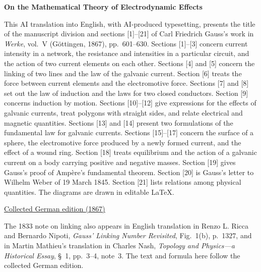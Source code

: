 \clearpage
{}
\thispagestyle{empty}
\begin{center}\Large\textbf{On the Mathematical Theory of Electrodynamic Effects}\end{center}

This AI translation into English, with AI-produced typesetting, presents the title of the manuscript division and sections [1]--[21] of Carl Friedrich Gauss’s work in \textit{Werke}, vol.~V (Göttingen, 1867), pp.~601--630. Sections [1]--[3] concern current intensity in a network, the resistance and intensities in a particular circuit, and the action of two current elements on each other. Sections [4] and [5] concern the linking of two lines and the law of the galvanic current. Section [6] treats the force between current elements and the electromotive force. Sections [7] and [8] set out the law of induction and the laws for two closed conductors. Section [9] concerns induction by motion. Sections [10]--[12] give expressions for the effects of galvanic currents, treat polygons with straight sides, and relate electrical and magnetic quantities. Sections [13] and [14] present two formulations of the fundamental law for galvanic currents. Sections [15]--[17] concern the surface of a sphere, the electromotive force produced by a newly formed current, and the effect of a wound ring. Section [18] treats equilibrium and the action of a galvanic current on a body carrying positive and negative masses. Section [19] gives Gauss’s proof of Ampère’s fundamental theorem. Section [20] is Gauss’s letter to Wilhelm Weber of 19 March 1845. Section [21] lists relations among physical quantities. The diagrams are drawn in editable \LaTeX{}.

\medskip\noindent
\href{https://gdz.sub.uni-goettingen.de/id/PPN236006339}{Collected German edition (1867)}

The 1833 note on linking also appears in English translation in Renzo L. Ricca and Bernardo Nipoti, \textit{Gauss’ Linking Number Revisited}, Fig.~1(b), p.~1327, and in Martin Mathieu’s translation in Charles Nash, \textit{Topology and Physics---a Historical Essay}, §~1, pp.~3--4, note~3. The text and formula here follow the collected German edition.

